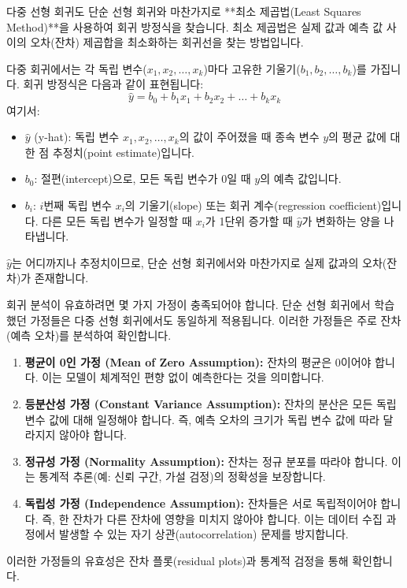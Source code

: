 \documentclass[11pt,a4paper]{article}
\begin{document}
\begin{tcolorbox}[title=\textbf{최소 제곱 추정 (Least Square Estimation)}]
다중 선형 회귀도 단순 선형 회귀와 마찬가지로 **최소 제곱법(Least Squares Method)**을 사용하여 회귀 방정식을 찾습니다. 최소 제곱법은 실제 값과 예측 값 사이의 오차(잔차) 제곱합을 최소화하는 회귀선을 찾는 방법입니다.

다중 회귀에서는 각 독립 변수($x_1, x_2, \dots, x_k$)마다 고유한 기울기($b_1, b_2, \dots, b_k$)를 가집니다. 회귀 방정식은 다음과 같이 표현됩니다:
\[ \hat{y} = b_0 + b_1x_1 + b_2x_2 + \dots + b_kx_k \]
여기서:
\begin{itemize}
    \item $\hat{y}$ (y-hat): 독립 변수 $x_1, x_2, \dots, x_k$의 값이 주어졌을 때 종속 변수 $y$의 평균 값에 대한 점 추정치(point estimate)입니다.
    \item $b_0$: 절편(intercept)으로, 모든 독립 변수가 0일 때 $y$의 예측 값입니다.
    \item $b_i$: $i$번째 독립 변수 $x_i$의 기울기(slope) 또는 회귀 계수(regression coefficient)입니다. 다른 모든 독립 변수가 일정할 때 $x_i$가 1단위 증가할 때 $\hat{y}$가 변화하는 양을 나타냅니다.
\end{itemize}
$\hat{y}$는 어디까지나 추정치이므로, 단순 선형 회귀에서와 마찬가지로 실제 값과의 오차(잔차)가 존재합니다.
\end{tcolorbox}

\begin{tcolorbox}[title=\textbf{회귀 모델의 가정 (Regression Model Assumptions)}]
회귀 분석이 유효하려면 몇 가지 가정이 충족되어야 합니다. 단순 선형 회귀에서 학습했던 가정들은 다중 선형 회귀에서도 동일하게 적용됩니다. 이러한 가정들은 주로 잔차(예측 오차)를 분석하여 확인합니다.

\begin{enumerate}
    \item \textbf{평균이 0인 가정 (Mean of Zero Assumption):} 잔차의 평균은 0이어야 합니다. 이는 모델이 체계적인 편향 없이 예측한다는 것을 의미합니다.
    \item \textbf{등분산성 가정 (Constant Variance Assumption):} 잔차의 분산은 모든 독립 변수 값에 대해 일정해야 합니다. 즉, 예측 오차의 크기가 독립 변수 값에 따라 달라지지 않아야 합니다.
    \item \textbf{정규성 가정 (Normality Assumption):} 잔차는 정규 분포를 따라야 합니다. 이는 통계적 추론(예: 신뢰 구간, 가설 검정)의 정확성을 보장합니다.
    \item \textbf{독립성 가정 (Independence Assumption):} 잔차들은 서로 독립적이어야 합니다. 즉, 한 잔차가 다른 잔차에 영향을 미치지 않아야 합니다. 이는 데이터 수집 과정에서 발생할 수 있는 자기 상관(autocorrelation) 문제를 방지합니다.
\end{enumerate}
이러한 가정들의 유효성은 잔차 플롯(residual plots)과 통계적 검정을 통해 확인합니다.
\end{tcolorbox}
\end{document}
